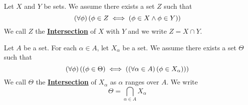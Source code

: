 \newcommand{\SetIntersection}[0]{\textbf{\hyperref[def:SetIntersection]{Intersection}}\xspace}
\newcommand{\SetIntersections}[0]{\textbf{\hyperref[def:SetIntersection]{Intersections}}\xspace}
\begin{df}
\label{def:SetIntersection}

\rm
    Let $X$ and $Y$ be sets. 
    We assume there exists a set $Z$ such that 
    \begin{equation*}
    \left( \forall \phi\right)\left( \phi \in Z \iff \left( \phi \in X \wedge \phi \in Y\right)\right)
    \end{equation*}
    We call $Z$ the \SetIntersection of $X$ with $Y$ and we write $Z = X \cap Y$.  


    Let $A$ be a set. 
    For each $\alpha \in A$, let $X_\alpha$ be a set. 
    We assume there exists a set $\Theta$ such that 
    \begin{equation*}
    \left( \forall \phi\right) \left( \left( \phi \in \Theta\right) \iff \left( \left( \forall \alpha \in A\right)\left( \phi \in X_\alpha\right)\right)\right)
    \end{equation*}
    We call $\Theta$ the \SetIntersection of $X_{\alpha}$ as $\alpha$ ranges over $A$. 
    We write 
    \begin{equation*}
    \Theta = \bigcap\limits_{\alpha \in A} X_\alpha
    \end{equation*}
\end{df}
